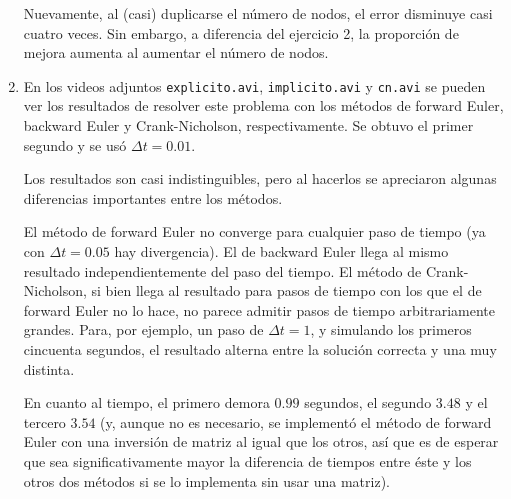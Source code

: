 \documentclass{article}
\begin{document}
\begin{enumerate}[1)]
{        Nuevamente, al (casi) duplicarse el número de nodos, el error disminuye casi cuatro
        veces. Sin embargo, a diferencia del ejercicio 2, la proporción de mejora aumenta
        al aumentar el número de nodos.
    }
    \item{ %
        En los videos adjuntos \texttt{explicito.avi}, \texttt{implicito.avi} y \texttt{cn.avi}
        se pueden ver los resultados de resolver este problema con los métodos de forward
        Euler, backward Euler y Crank-Nicholson, respectivamente. Se obtuvo el primer segundo
        y se usó $\Delta t = 0.01$.

        Los resultados son casi indistinguibles, pero al hacerlos se apreciaron algunas
        diferencias importantes entre los métodos.
        
        El método de forward Euler no converge para cualquier paso de tiempo (ya con 
        $\Delta t = 0.05$ hay divergencia). El de backward Euler llega al mismo resultado
        independientemente del paso del tiempo. El método de Crank-Nicholson, si bien
        llega al resultado para pasos de tiempo con los que el de forward Euler no lo hace,
        no parece admitir pasos de tiempo arbitrariamente grandes. Para, por ejemplo,
        un paso de $\Delta t = 1$, y simulando los primeros cincuenta segundos, el resultado
        alterna entre la solución correcta y una muy distinta.

        En cuanto al tiempo, el primero demora $0.99$ segundos, el segundo $3.48$ y el
        tercero $3.54$ (y, aunque no es necesario, se implementó el método de forward
        Euler con una inversión de matriz al igual que los otros, así que es de esperar
        que sea significativamente mayor la diferencia de tiempos entre éste y los
        otros dos métodos si se lo implementa sin usar una matriz).
    }
\end{enumerate}
\end{document}
